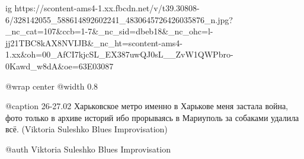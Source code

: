  
 
 
 
 


\begin{minipage}{\textwidth}

\ifcmt
  ig https://scontent-ams4-1.xx.fbcdn.net/v/t39.30808-6/328142055_588614892602241_4830645726426035876_n.jpg?_nc_cat=107&ccb=1-7&_nc_sid=dbeb18&_nc_ohc=l-jj21TBC8kAX8NVIJB&_nc_ht=scontent-ams4-1.xx&oh=00_AfCI7kjcSL_EX387uwQJ0sL__ZvW1QWPbro-0Kawd_w8dA&oe=63E03087

  @wrap center
  @width 0.8

	@caption 26-27.02 Харьковское метро именно в Харькове меня застала война, фото только в архиве историй ибо прорываясь в Мариуполь за собаками удалила всё. (Viktoria Suleshko Blues Improvisation)

  @auth Viktoria Suleshko Blues Improvisation

\fi
\end{minipage}

